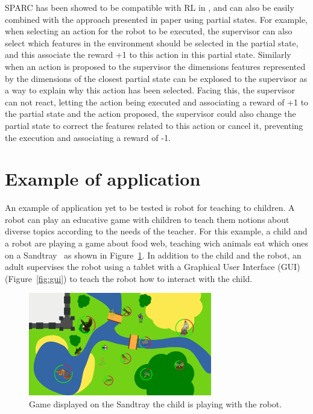 \documentclass[letterpaper]{article} %
\begin{document}
SPARC has been showed to be compatible with RL in \cite{senft2017supervised},
and can also be easily combined with the approach presented in paper using
partial states. For example, when selecting an action for the robot to be
executed, the supervisor can also select which features in the environment
should be selected in the partial state, and this associate the reward +1
to this action in this partial state. Similarly when an action is
proposed
to the supervisor the dimensions features represented by the dimensions of the
closest partial state can be explosed to the supervisor as a way to explain why
this action has been selected. Facing this, the supervisor can not react,
letting the action being executed and associating a reward of +1 to the partial
state and the action proposed, the supervisor could also change the partial
state to correct the features related to this action or cancel it, preventing the
execution and associating a reward of -1.

\section{Example of application}

An example of application yet to be tested is robot for teaching to children.
A robot can play an educative game with children to teach them notions about
diverse topics according to the needs of the teacher. For this example, a child
and a robot are playing a game about food web, teaching wich animals eat which
ones on a Sandtray~\cite{baxter2012touchscreen} as shown in
Figure~\ref{fig:game}. In addition to the child and
the robot, an adult supervises the robot using a tablet with a Graphical User
Interface (GUI) (Figure~\ref{fig:gui}) to teach the robot how to interact with the child.
\begin{figure}
        \centering
  \includegraphics[width=80mm]{./fig/game.png} 
    \caption{Game displayed on the Sandtray the child is playing with the robot.}
        \label{fig:game}
\end{figure}
\end{document}
